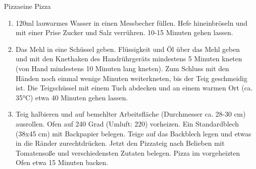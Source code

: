 \documentclass{article}
\begin{document}
\begin{recipe}{Pizza}{eine Pizza}{}




\begin{enumerate}
\item 120ml lauwarmes Wasser in einen Messbecher füllen. Hefe hineinbröseln und mit einer Prise Zucker und Salz verrühren. 10-15 Minuten gehen lassen.
\item Das Mehl in eine Schüssel geben. Flüssigkeit und Öl über das Mehl geben und mit den Knethaken des Handrührgeräts mindestens 5 Minuten kneten (von Hand mindestens 10 Minuten lang kneten). Zum Schluss mit den Händen noch einmal wenige Minuten weiterkneten, bis der Teig geschmeidig ist. Die Teigschüssel mit einem Tuch abdecken und an einem warmen Ort (ca. 35°C) etwa 40 Minuten gehen lassen.
\item Teig halbieren und auf bemehlter Arbeitsfläche  (Durchmesser ca. 28-30 cm)  ausrollen. Ofen auf 240 Grad (Umluft: 220) vorheizen. Ein Standardblech (38x45 cm) mit Backpapier belegen. Teige auf das Backblech legen und etwas in die Ränder zurechtdrücken. Jetzt den Pizzateig nach Belieben mit Tomatensoße und verschiedensten Zutaten belegen. Pizza im vorgeheizten Ofen etwa 15 Minuten backen.
\end{enumerate}
\end{recipe}
\end{document}
